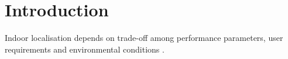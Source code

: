 \chapter{Introduction}

Indoor localisation depends on trade-off among performance parameters, user requirements and environmental conditions \cite{mainetti_survey_2014}.


